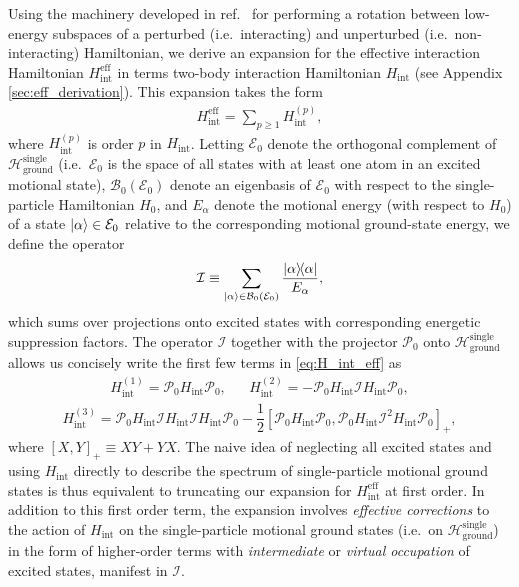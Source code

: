 \documentclass[preprint,showkeys,nofootinbib]{revtex4-1}
\renewcommand{\t}{\text} %
\newcommand{\f}{\dfrac} %
\newcommand{\p}[1]{\left(#1\right)} %
\renewcommand{\sp}[1]{\left[#1\right]} %
\newcommand{\B}{\mathcal{B}}
\newcommand{\E}{\mathcal{E}}
\renewcommand{\H}{\mathcal{H}}
\newcommand{\I}{\mathcal{I}}
\renewcommand{\P}{\mathcal{P}}
\newcommand{\1}{\mathds{1}}
\begin{document}
Using the machinery developed in ref.~\cite{bravyi2011schrieffer} for
performing a rotation between low-energy subspaces of a perturbed
(i.e.~interacting) and unperturbed (i.e.~non-interacting) Hamiltonian,
we derive an expansion for the effective interaction Hamiltonian
$H_{\t{int}}^{\t{eff}}$ in terms two-body interaction Hamiltonian
$H_{\t{int}}$ (see Appendix \ref{sec:eff_derivation}).  This expansion
takes the form
\begin{align}
  H_{\t{int}}^{\t{eff}} = \sum_{p\ge1} H_{\t{int}}^{(p)},
  \label{eq:H_int_eff}
\end{align}
where $H_{\t{int}}^{(p)}$ is order $p$ in $H_{\t{int}}$.  Letting
$\E_0$ denote the orthogonal complement of
$\H_{\t{ground}}^{\t{single}}$ (i.e.~$\E_0$ is the space of all states
with at least one atom in an excited motional state), $\B_0\p{\E_0}$
denote an eigenbasis of $\E_0$ with respect to the single-particle
Hamiltonian $H_0$, and $E_\alpha$ denote the motional energy (with
respect to $H_0$) of a state $\ket\alpha\in\E_0$ relative to the
corresponding motional ground-state energy, we define the operator
\begin{align}
  \I \equiv \sum_{\ket\alpha\in\B_0\p{\E_0}} \f{\op\alpha}{E_\alpha},
\end{align}
which sums over projections onto excited states with corresponding
energetic suppression factors.  The operator $\I$ together with the
projector $\P_0$ onto $\H_{\t{ground}}^{\t{single}}$ allows us
concisely write the first few terms in \eqref{eq:H_int_eff} as
\begin{align}
  H_{\t{int}}^{(1)} = \P_0 H_{\t{int}} \P_0,
  &&
  H_{\t{int}}^{(2)} = -\P_0 H_{\t{int}} \I H_{\t{int}} \P_0,
  \label{eq:H_int_1_2}
\end{align}
\begin{align}
  H_{\t{int}}^{(3)}
  = \P_0 H_{\t{int}} \I H_{\t{int}} \I H_{\t{int}} \P_0
  - \f12\sp{\P_0 H_{\t{int}} \P_0,
    \P_0 H_{\t{int}} \I^2 H_{\t{int}} \P_0}_+,
  \label{eq:H_int_3}
\end{align}
where $\sp{X,Y}_+\equiv XY+YX$.  The naive idea of neglecting all
excited states and using $H_{\t{int}}$ directly to describe the
spectrum of single-particle motional ground states is thus equivalent
to truncating our expansion for $H_{\t{int}}^{\t{eff}}$ at first
order.  In addition to this first order term, the expansion involves
{\it effective corrections} to the action of $H_{\t{int}}$ on the
single-particle motional ground states (i.e.~on
$\H_{\t{ground}}^{\t{single}}$) in the form of higher-order terms with
{\it intermediate} or {\it virtual occupation} of excited states,
manifest in $\I$.
\end{document}
